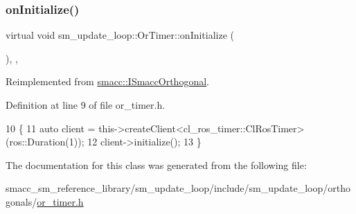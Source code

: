 \subsubsection{\texorpdfstring{on\+Initialize()}{onInitialize()}}
{\footnotesize\ttfamily virtual void sm\+\_\+update\+\_\+loop\+::\+Or\+Timer\+::on\+Initialize (\begin{DoxyParamCaption}{ }\end{DoxyParamCaption})\hspace{0.3cm}{\ttfamily [inline]}, {\ttfamily [override]}, {\ttfamily [virtual]}}



Reimplemented from \hyperlink{classsmacc_1_1ISmaccOrthogonal_a6bb31c620cb64dd7b8417f8705c79c7a}{smacc\+::\+I\+Smacc\+Orthogonal}.



Definition at line 9 of file or\+\_\+timer.\+h.


\begin{DoxyCode}
10     \{
11         \textcolor{keyword}{auto} client = this->createClient<cl\_ros\_timer::ClRosTimer>(ros::Duration(1));
12         client->initialize();
13     \}
\end{DoxyCode}


The documentation for this class was generated from the following file\+:\begin{DoxyCompactItemize}
\item 
smacc\+\_\+sm\+\_\+reference\+\_\+library/sm\+\_\+update\+\_\+loop/include/sm\+\_\+update\+\_\+loop/orthogonals/\hyperlink{sm__update__loop_2include_2sm__update__loop_2orthogonals_2or__timer_8h}{or\+\_\+timer.\+h}\end{DoxyCompactItemize}

